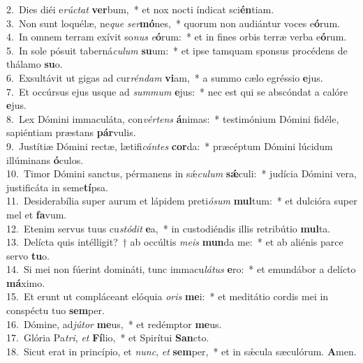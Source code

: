 {2.~}Dies diéi e\textit{rú}\textit{ctat} \textbf{ver}bum,~* et nox nocti índicat sci\textbf{én}tiam.\\
{3.~}Non sunt loquélæ, ne\textit{que} \textit{ser}\textbf{mó}nes,~* quorum non audiántur voces e\textbf{ó}rum.\\
{4.~}In omnem terram exívit so\textit{nus} \textit{e}\textbf{ó}rum:~* et in fines orbis terræ verba e\textbf{ó}rum.\\
{5.~}In sole pósuit taberná\textit{cu}\textit{lum} \textbf{su}um:~* et ipse tamquam sponsus procédens de thálamo \textbf{su}o.\\
{6.~}Exsultávit ut gigas ad cur\textit{rén}\textit{dam} \textbf{vi}am,~* a summo cælo egréssio \textbf{e}jus.\\
{7.~}Et occúrsus ejus usque ad \textit{sum}\textit{mum} \textbf{e}jus:~* nec est qui se abscóndat a calóre \textbf{e}jus.\\
{8.~}Lex Dómini immaculáta, con\textit{vér}\textit{tens} \textbf{á}nimas:~* testimónium Dómini fidéle, sapiéntiam præstans \textbf{pár}vulis.\\
{9.~}Justítiæ Dómini rectæ, lætifi\textit{cán}\textit{tes} \textbf{cor}da:~* præcéptum Dómini lúcidum illúminans \textbf{ó}culos.\\
{10.~}Timor Dómini sanctus, pérmanens in sǽ\textit{cu}\textit{lum} \textbf{sǽ}culi:~* judícia Dómini vera, justificáta in seme\textbf{tí}psa.\\
{11.~}Desiderabília super aurum et lápidem preti\textit{ó}\textit{sum} \textbf{mul}tum:~* et dulcióra super mel et \textbf{fa}vum.\\
{12.~}Etenim servus tuus cu\textit{stó}\textit{dit} \textbf{e}a,~* in custodiéndis illis retribútio \textbf{mul}ta.\\
{13.~}Delícta quis intélligit?~† ab occúltis \textit{me}\textit{is} \textbf{mun}da me:~* et ab aliénis parce servo \textbf{tu}o.\\
{14.~}Si mei non fúerint domináti, tunc immacu\textit{lá}\textit{tus} \textbf{e}ro:~* et emundábor a delícto \textbf{má}ximo.\\
{15.~}Et erunt ut compláceant elóquia \textit{o}\textit{ris} \textbf{me}i:~* et meditátio cordis mei in conspéctu tuo \textbf{sem}per.\\
{16.~}Dómine, ad\textit{jú}\textit{tor} \textbf{me}us,~* et redémptor \textbf{me}us.\\
{17.~}Glória Pa\textit{tri}, \textit{et} \textbf{Fí}lio,~* et Spirítui \textbf{San}cto.\\
{18.~}Sicut erat in princípio, et \textit{nunc}, \textit{et} \textbf{sem}per,~* et in sǽcula sæculórum. \textbf{A}men.\\
